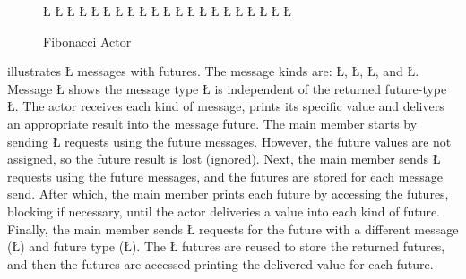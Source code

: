 \documentclass[openright,twoside]{report}
\begin{document}
\begin{figure}
{\L{\LB{}}
\L{\LB{}}
\L{\LB{}}
\L{\LB{}}
\L{\LB{}}
\L{\LB{}}
\L{\LB{}}
\L{\LB{}}
\CE{}\L{\LB{}}
\L{\LB{}}
\L{\LB{}}
\L{\LB{}}
\L{\LB{}}
\L{\LB{}}
\L{\LB{}}
\L{\LB{}}
\L{\LB{}}
\L{\LB{}}
\CE{}\L{\LB{}}
\L{\LB{}}
\L{\LB{\};}}
\endlgrinde\LGend
}%
\caption{Fibonacci Actor}
\label{f:FibonacciActor}
\end{figure}

 illustrates \LGinlinetrue\LGbegin\lgrinde\L{}\endlgrinde\LGend{} messages with futures.
The message kinds are: \LGinlinetrue\LGbegin\lgrinde\L{}\endlgrinde\LGend{}, \LGinlinetrue\LGbegin\lgrinde\L{}\endlgrinde\LGend{}, \LGinlinetrue\LGbegin\lgrinde\L{}\endlgrinde\LGend{}, and \LGinlinetrue\LGbegin\lgrinde\L{}\endlgrinde\LGend{}.
Message \LGinlinetrue\LGbegin\lgrinde\L{}\endlgrinde\LGend{} shows the message type \LGinlinetrue\LGbegin\lgrinde\L{}\endlgrinde\LGend{} is independent of the returned future-type \LGinlinetrue\LGbegin\lgrinde\L{}\endlgrinde\LGend{}.
The actor receives each kind of message, prints its specific value and delivers an appropriate result into the message future.
The main member starts by sending \LGinlinetrue\LGbegin\lgrinde\L{}\endlgrinde\LGend{} requests using the future messages.
However, the future values are not assigned, so the future result is lost (ignored).
Next, the main member sends \LGinlinetrue\LGbegin\lgrinde\L{}\endlgrinde\LGend{} requests using the future messages, and the futures are stored for each message send.
After which, the main member prints each future by accessing the futures, blocking if necessary, until the actor deliveries a value into each kind of future.
Finally, the main member sends \LGinlinetrue\LGbegin\lgrinde\L{}\endlgrinde\LGend{} requests for the future with a different message (\LGinlinetrue\LGbegin\lgrinde\L{}\endlgrinde\LGend{}) and future type (\LGinlinetrue\LGbegin\lgrinde\L{}\endlgrinde\LGend{}).
The \LGinlinetrue\LGbegin\lgrinde\L{}\endlgrinde\LGend{} futures are reused to store the returned futures, and then the futures are accessed printing the delivered value for each future.
\end{document}
